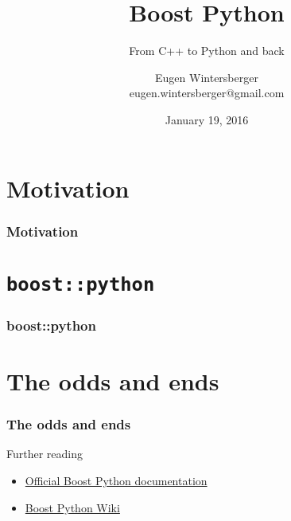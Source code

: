 \documentclass{beamer}
\title{{\Huge Boost Python}}
\subtitle{From C++ to Python and back}
\author{Eugen Wintersberger\\ \small{eugen.wintersberger@gmail.com}}
\date{January 19, 2016}
\begin{document}
\frame{\titlepage}
\part{Motivation}
\section{Motivation}


\part{\texttt{boost::python}}
\section{boost::python}
\frame{\partpage}


\part{The odds and ends}
\section{The odds and ends}
\frame{\partpage}

\begin{frame}[fragile]{Further reading}

    \begin{itemize}
        \item
            \href{http://www.boost.org/doc/libs/1_60_0/libs/python/doc/html/index.html}
            {Official Boost Python documentation}
        \item 
            \href{https://wiki.python.org/moin/boost.python}
            {Boost Python Wiki}
    \end{itemize}

\end{frame}
\end{document}

